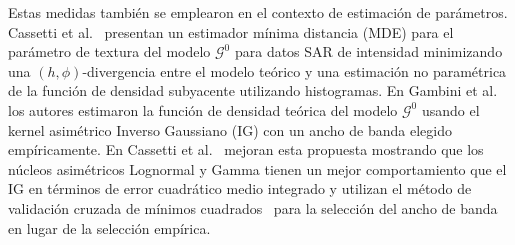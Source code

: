 \documentclass[11pt]{article}
\begin{document}
%
%
%


Estas medidas también se emplearon en el contexto de estimación de parámetros. Cassetti et al.~\cite{APSAR2013ParameterEstimationStochasticDistances} presentan un estimador mínima distancia (MDE) para el parámetro de textura del modelo $\mathcal{G}^0$ para datos SAR de intensidad minimizando una $(h,\phi)$-divergencia entre el modelo teórico y una estimación no paramétrica de la función de densidad subyacente utilizando histogramas. En Gambini et al.~\cite{gambini2015} los autores estimaron la función de densidad teórica del modelo $\mathcal{G}^0$  usando el kernel asimétrico Inverso Gaussiano (IG) con un ancho de banda elegido empíricamente. En Cassetti et al.~\cite{Cassetti2020} mejoran esta propuesta mostrando que los núcleos asimétricos Lognormal y Gamma tienen un mejor comportamiento que el IG en términos de error cuadrático medio integrado y utilizan el método de validación cruzada de mínimos cuadrados~\cite{Rudemo1982} para la selección del ancho de banda en lugar de la selección empírica.
\end{document}
